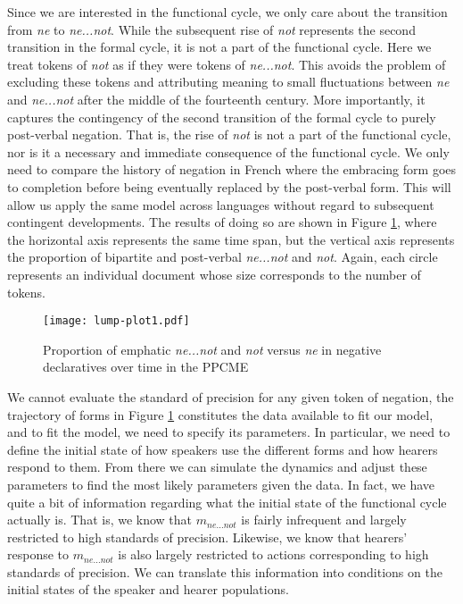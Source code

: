 \documentclass[linguex]{sp}
\theoremstyle{definition} \newtheorem{definition}{Definition}
\begin{document}
Since we are interested in the functional cycle, we only care about the transition from \textit{\color{red} ne} to \textit{\color{blue} ne...not}. While the subsequent rise of \textit{\color{green} not} represents the second transition in the formal cycle, it is not a part of the functional cycle. Here we treat tokens of \textit{\color{green} not} as if they were tokens of  \textit{\color{blue} ne...not}.  This avoids the problem of excluding these tokens and attributing meaning to small fluctuations between  \textit{\color{red} ne} and \textit{\color{blue} ne...not} after the middle of the fourteenth century.  More importantly, it captures the contingency of the second transition of the formal cycle to purely post-verbal negation.  That is, the rise of \textit{\color{green} not} is not a part of the functional cycle, nor is it a necessary and immediate consequence of the functional cycle. We only need to compare the history of negation in French where the embracing form goes to completion before being eventually replaced by the post-verbal form.  This will allow us apply the same model across languages without regard to subsequent contingent developments.  The results of doing so are shown in Figure \ref{lump-plot1}, where the horizontal axis represents the same time span, but the vertical axis represents the proportion of bipartite and post-verbal \textit{\color{blue} ne...not} and \textit{\color{green} not}. Again, each circle represents an individual document whose size corresponds to the number of tokens.

\begin{figure}
\centering
     \texttt{[image: lump-plot1.pdf]}
\caption{Proportion of emphatic \textit{\color{blue} ne...not} and \textit{\color{green} not}  versus  \textit{\color{red}  ne} in negative declaratives over time in the PPCME}
\label{lump-plot1}
\end{figure}

We cannot evaluate the standard of precision for any given token of negation, the trajectory of forms in Figure \ref{lump-plot1} constitutes the data available to fit our model, and to fit the model, we need to specify its parameters. In particular, we need to define the initial state of how speakers use the different forms and how hearers respond to them. From there we can simulate the dynamics and adjust these parameters to find the most likely parameters given the data.  In fact, we have quite a bit of information regarding what the initial state of the functional cycle actually is. That is, we know that \textit{\color{blue} $m_{ne...not}$}  is fairly infrequent and largely restricted to high standards of precision. Likewise, we know that hearers' response to \textit{\color{blue} $m_{ne...not}$}  is also largely restricted to actions corresponding to high standards of precision. We can translate this information into conditions on the initial states of the speaker and hearer populations.
\end{document}
